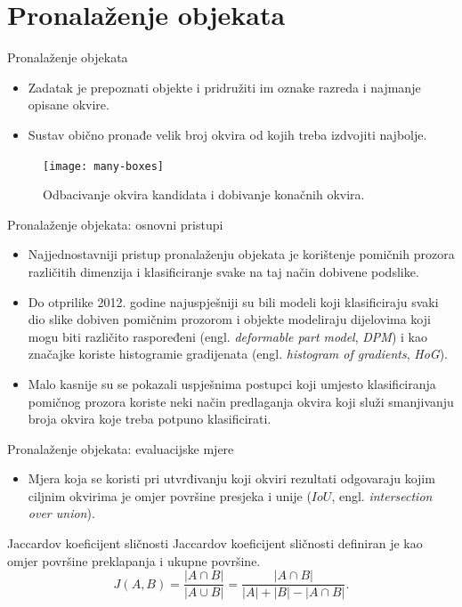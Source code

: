\documentclass{beamer}
\begin{document}
\section{Pronalaženje objekata}

\begin{frame}{Pronalaženje objekata}
	\begin{itemize}
		\item Zadatak je prepoznati objekte i pridružiti im oznake razreda i najmanje opisane okvire.
		\item Sustav obično pronađe velik broj okvira od kojih treba izdvojiti najbolje.
	\end{itemize}
	\begin{figure}[ht] \centering
		\texttt{[image: many-boxes]}
		\caption{Odbacivanje okvira kandidata i dobivanje konačnih okvira.}
		\label{fig:stanfordbgdsi}
	\end{figure}
\end{frame}


\begin{frame}{Pronalaženje objekata: osnovni pristupi}
	\begin{itemize}
		\item  Najjednostavniji pristup pronalaženju objekata je korištenje pomičnih prozora različitih dimenzija i klasificiranje svake na taj način dobivene podslike.
		\item Do otprilike 2012. godine najuspješniji su bili modeli koji klasificiraju svaki dio slike dobiven pomičnim prozorom i objekte modeliraju dijelovima koji mogu biti različito raspoređeni (engl. \emph{deformable part model}, \emph{DPM}) i kao značajke koriste histogramie gradijenata (engl. \emph{histogram of gradients}, \emph{HoG}).
		\item Malo kasnije su se pokazali uspješnima postupci koji umjesto klasificiranja pomičnog prozora koriste neki način predlaganja okvira  koji služi smanjivanju broja okvira koje treba potpuno klasificirati.
	\end{itemize}
\end{frame}

\begin{frame}{Pronalaženje objekata: evaluacijske mjere}
	\begin{itemize}
		\item  Mjera koja se koristi pri utvrđivanju koji okviri rezultati odgovaraju kojim ciljnim okvirima je omjer površine presjeka i unije ($\mathit{IoU}$, engl. \emph{intersection over union}).
	\end{itemize}
	\begin{block}{Jaccardov koeficijent sličnosti}
		Jaccardov koeficijent sličnosti definiran je kao omjer površine preklapanja i ukupne površine.
		$$
		J(A,B) = \frac{|A\cap B|}{|A\cup B|} = \frac{|A\cap B|}{|A|+|B|-|A\cap B|}.
		$$			
	\end{block}
\end{frame}
\end{document}
